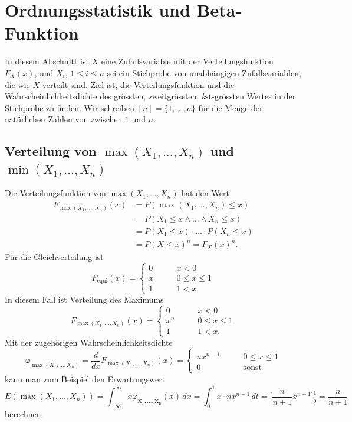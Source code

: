 %
%
%
\section{Ordnungsstatistik und Beta-Funktion
\label{dreieck:section:ordnungsstatistik}}
In diesem Abschnitt ist $X$ eine Zufallsvariable mit der Verteilungsfunktion
$F_X(x)$, und $X_i$, $1\le i\le n$ sei ein Stichprobe von unabhängigen
Zufallsvariablen, die wie $X$ verteilt sind.
Ziel ist, die Verteilungsfunktion und die Wahrscheinlichkeitsdichte
des grössten, zweitgrössten, $k$-t-grössten Wertes in der Stichprobe
zu finden.
Wir schreiben $[n]=\{1,\dots,n\}$ für die Menge der natürlichen
Zahlen von zwischen $1$ und $n$.

\subsection{Verteilung von $\operatorname{max}(X_1,\dots,X_n)$ und
$\operatorname{min}(X_1,\dots,X_n)$
\label{dreieck:subsection:minmax}}
Die Verteilungsfunktion von $\operatorname{max}(X_1,\dots,X_n)$ hat
den Wert
\begin{align*}
F_{\operatorname{max}(X_1,\dots,X_n)}(x)
&=
P(\operatorname{max}(X_1,\dots,X_n) \le x)
\\
&=
P(X_1\le x\wedge \dots \wedge X_n\le x)
\\
&=
P(X_1\le x) \cdot \ldots \cdot P(X_n\le x)
\\
&=
P(X\le x)^n
=
F_X(x)^n.
\end{align*}
Für die Gleichverteilung ist
\[
F_{\text{equi}}(x)
=
\begin{cases}
0&\qquad x< 0
\\
x&\qquad 0\le x\le 1
\\
1&\qquad 1<x.
\end{cases}
\]
In diesem Fall ist Verteilung des Maximums
\[
F_{\operatorname{max}(X_1,\dots,X_n)}(x)
=
\begin{cases}
0&\qquad x<0\\
x^n&\qquad 0\le x\le 1\\
1&\qquad 1 < x.
\end{cases}
\]
Mit der zugehörigen Wahrscheinlichkeitsdichte
\[
\varphi_{\operatorname{max}(X_1,\dots,X_n)}
=
\frac{d}{dx}
F_{\operatorname{max}(X_1,\dots,X_n)}(x)
=
\begin{cases}
nx^{n-1}&\qquad 0\le x\le 1\\
0       &\qquad \text{sonst}
\end{cases}
\]
kann man zum Beispiel den Erwartungswert
\[
E(\operatorname{max}(X_1,\dots,X_n))
=
\int_{-\infty}^\infty 
x
\varphi_{\operatorname{X_1,\dots,X_n}}(x)
\,dx
=
\int_{0}^1 x\cdot nx^{n-1}\,dt
=
\biggl[
\frac{n}{n+1}x^{n+1}
\biggr]_0^1
=
\frac{n}{n+1}
\]
berechnen.


